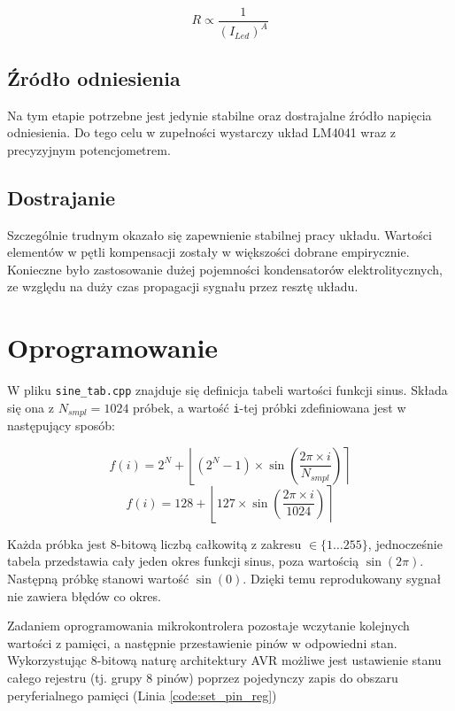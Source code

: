 \documentclass[12pt, a4paper]{article}
\begin{document}
\begin{equation}
	R \propto \frac{1}{(I_{Led})^A}
\end{equation}

\subsection{Źródło odniesienia}
Na tym etapie potrzebne jest jedynie stabilne oraz dostrajalne źródło napięcia odniesienia.
Do tego celu w zupełności wystarczy układ LM4041 wraz z precyzyjnym potencjometrem.

\subsection{Dostrajanie}
Szczególnie trudnym okazało się zapewnienie stabilnej pracy układu. 
Wartości elementów w pętli kompensacji zostały w większości dobrane empirycznie.
Konieczne było zastosowanie dużej pojemności kondensatorów elektrolitycznych, 
ze względu na duży czas propagacji sygnału przez resztę układu.

\section{Oprogramowanie}
\label{sec:impl}
W pliku \verb|sine_tab.cpp| znajduje się definicja tabeli wartości funkcji sinus. Składa się ona z $N_{smpl}=1024$ próbek, a wartość \verb|i|-tej próbki 
zdefiniowana jest w następujący sposób:

\begin{equation}
	f(i) = 2^N + \left\lfloor (2^N - 1) \times \sin \left(\frac{2 \pi \times i}{N_{smpl}}\right)\right\rceil
\end{equation}
\begin{equation}
	f(i) = 128 + \left\lfloor 127 \times \sin \left(\frac{2 \pi \times i}{1024}\right)\right\rceil
\end{equation}

Każda próbka jest 8-bitową liczbą całkowitą z zakresu $\in \{1 \dots 255\}$, jednocześnie tabela przedstawia cały jeden okres funkcji sinus,
poza wartością $\sin (2 \pi)$. Następną próbkę stanowi wartość $\sin (0)$. Dzięki temu reprodukowany sygnał nie zawiera błędów co okres.

Zadaniem oprogramowania mikrokontrolera pozostaje wczytanie kolejnych wartości z pamięci,
a następnie przestawienie pinów w odpowiedni stan. Wykorzystując 8-bitową naturę architektury AVR
możliwe jest ustawienie stanu całego rejestru (tj. grupy 8 pinów) poprzez pojedynczy zapis do 
obszaru peryferialnego pamięci (Linia \ref{code:set_pin_reg})
\end{document}
